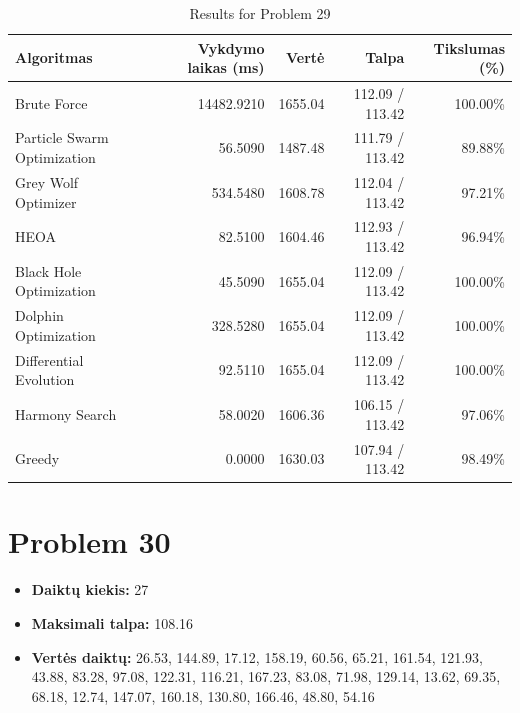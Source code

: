 \documentclass[a4paper,11pt]{article}
\begin{document}
\begin{table}[h!]
\centering
\begin{tabular}{lrrrr}
\toprule
\textbf{Algoritmas} & \textbf{Vykdymo laikas (ms)} & \textbf{Vertė} & \textbf{Talpa} & \textbf{Tikslumas (\%)} \\
\midrule
Brute Force & 14482.9210 & 1655.04 & 112.09 / 113.42 & 100.00\% \\
Particle Swarm Optimization & 56.5090 & 1487.48 & 111.79 / 113.42 & 89.88\% \\
Grey Wolf Optimizer & 534.5480 & 1608.78 & 112.04 / 113.42 & 97.21\% \\
HEOA & 82.5100 & 1604.46 & 112.93 / 113.42 & 96.94\% \\
Black Hole Optimization & 45.5090 & 1655.04 & 112.09 / 113.42 & 100.00\% \\
Dolphin Optimization & 328.5280 & 1655.04 & 112.09 / 113.42 & 100.00\% \\
Differential Evolution & 92.5110 & 1655.04 & 112.09 / 113.42 & 100.00\% \\
Harmony Search & 58.0020 & 1606.36 & 106.15 / 113.42 & 97.06\% \\
Greedy & 0.0000 & 1630.03 & 107.94 / 113.42 & 98.49\% \\
\bottomrule
\end{tabular}
\caption{Results for Problem 29}
\end{table}
\clearpage

\section*{Problem 30}
\begin{itemize}
    \item \textbf{Daiktų kiekis:} 27
    \item \textbf{Maksimali talpa:} 108.16
    \item \textbf{Vertės daiktų:} 26.53, 144.89, 17.12, 158.19, 60.56, 65.21, 161.54, 121.93, 43.88, 83.28, 97.08, 122.31, 116.21, 167.23, 83.08, 71.98, 129.14, 13.62, 69.35, 68.18, 12.74, 147.07, 160.18, 130.80, 166.46, 48.80, 54.16
\end{itemize}
\end{document}
